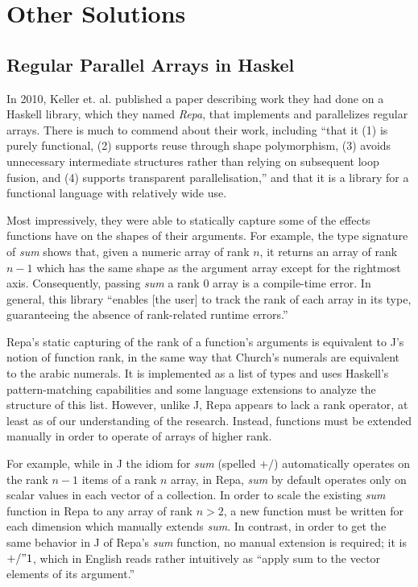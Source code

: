 \section{Other Solutions}
\subsection{Regular Parallel Arrays in Haskel}
In 2010, Keller et. al. published a paper\cite{dph} 
describing work they had done on a Haskell library, which they named \textit{Repa}, that implements and parallelizes regular arrays.
There is much to commend about their work, including ``that it (1) is purely
functional, (2) supports reuse through shape polymorphism, (3)
avoids unnecessary intermediate structures rather than relying on
subsequent loop fusion, and (4) supports transparent parallelisation,''
and that it is a library for a functional language with relatively wide use.

Most impressively, they were able to statically capture some of the effects functions have on the shapes of their arguments.
For example, the type signature of \textit{sum} shows that, given a numeric array of rank $n$, 
it returns an array of rank $n-1$ which has the same shape as the argument array except for the rightmost axis.
Consequently, passing \textit{sum} a rank 0 array is a compile-time error.
In general, this library ``enables [the user] to track the rank of each array in its type,
guaranteeing the absence of rank-related runtime errors.''

Repa's static capturing of the rank of a function's arguments is equivalent to J's notion of function rank, 
in the same way that Church's numerals are equivalent to the arabic numerals. %
It is implemented as a list of types and uses Haskell's pattern-matching capabilities and some language extensions 
to analyze the structure of this list.
However, unlike J, Repa appears to lack a rank operator, at least as of our understanding of the research.
Instead, functions must be extended manually in order to operate of arrays of higher rank.

For example, while in J the idiom for \textit{sum} (spelled $+/$) automatically operates on the rank $n-1$ items of a rank $n$ array, 
in Repa, \textit{sum} by default operates only on scalar values in each vector of a collection.
In order to scale the existing \textit{sum} function in Repa to any array of rank $n > 2$, 
a new function must be written for each dimension which manually extends \textit{sum}.
In contrast, in order to get the same behavior in J of Repa's \textit{sum} function, no manual extension is required; 
it is $+/ " 1$, which in English reads rather intuitively as ``apply sum to the vector elements of its argument.''

